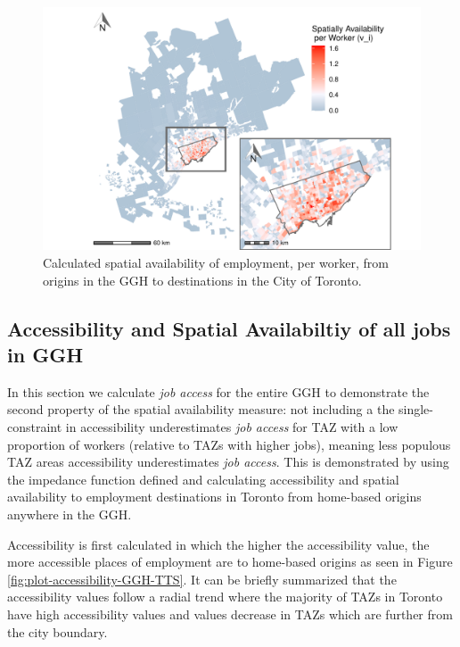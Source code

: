 \documentclass[]{elsarticle} %
\begin{document}
\begin{figure}
\includegraphics[width=1\linewidth]{Spatial-Availability_files/figure-latex/plot-avail-Toronto-TTS-per-worker-1} \caption{\label{fig:plot-avail-Toronto-TTS-per-worker}Calculated spatial availability of employment, per worker, from origins in the GGH to destinations in the City of Toronto.}\label{fig:plot-avail-Toronto-TTS-per-worker}
\end{figure}

\hypertarget{accessibility-and-spatial-availabiltiy-of-all-jobs-in-ggh}{%
\subsection{Accessibility and Spatial Availabiltiy of all jobs in
GGH}\label{accessibility-and-spatial-availabiltiy-of-all-jobs-in-ggh}}

In this section we calculate \emph{job access} for the entire GGH to
demonstrate the second property of the spatial availability measure: not
including a the single-constraint in accessibility underestimates
\emph{job access} for TAZ with a low proportion of workers (relative to
TAZs with higher jobs), meaning less populous TAZ areas accessibility
underestimates \emph{job access}. This is demonstrated by using the
impedance function defined and calculating accessibility and spatial
availability to employment destinations in Toronto from home-based
origins anywhere in the GGH.

Accessibility is first calculated in which the higher the accessibility
value, the more accessible places of employment are to home-based
origins as seen in Figure \ref{fig:plot-accessibility-GGH-TTS}. It can
be briefly summarized that the accessibility values follow a radial
trend where the majority of TAZs in Toronto have high accessibility
values and values decrease in TAZs which are further from the city
boundary.
\end{document}
